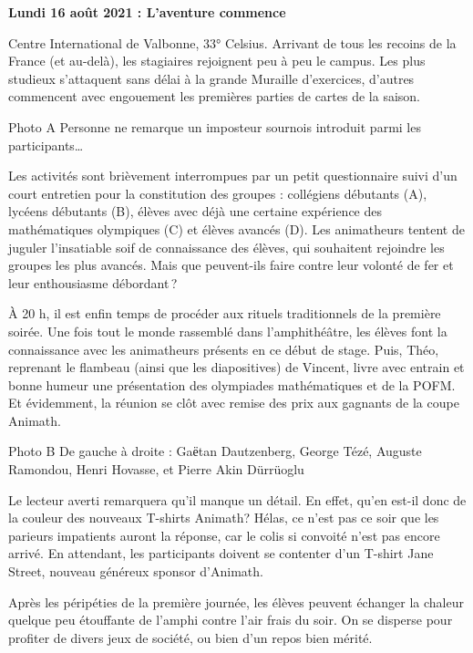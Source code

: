 \begin{center}
{\textbf{Lundi 16 août 2021 : L’aventure commence}}
\end{center}
\vspace{2mm}

Centre International de Valbonne, 33° Celsius. Arrivant de tous les recoins de la France (et au-delà), les stagiaires rejoignent peu à peu le campus. Les plus studieux s’attaquent sans délai à la grande Muraille d’exercices, d’autres commencent avec engouement les premières parties de cartes de la saison.

Photo A
Personne ne remarque un imposteur sournois introduit parmi les participants…

Les activités sont brièvement interrompues par un petit questionnaire suivi d’un court entretien pour la constitution des groupes : collégiens débutants (A), lycéens débutants (B), élèves avec déjà une certaine expérience des mathématiques olympiques (C) et élèves avancés (D). Les animatheurs tentent de juguler l’insatiable soif de connaissance des élèves, qui souhaitent rejoindre les groupes les plus avancés. Mais que peuvent-ils faire contre leur volonté de fer et leur enthousiasme débordant ?

À 20 h, il est enfin temps de procéder aux rituels traditionnels de la première soirée. Une fois tout le monde rassemblé dans l’amphithéâtre, les élèves font la connaissance avec les animatheurs présents en ce début de stage. Puis, Théo, reprenant le flambeau (ainsi que les diapositives) de Vincent, livre avec entrain et bonne humeur une présentation des olympiades mathématiques et de la POFM. Et évidemment, la réunion se clôt avec remise des prix aux gagnants de la coupe Animath.

Photo B
De gauche à droite : Gaёtan Dautzenberg, George Tézé, Auguste Ramondou, Henri Hovasse, et Pierre Akin Dürrüoglu

Le lecteur averti remarquera qu’il manque un détail. En effet, qu’en est-il donc de la couleur des nouveaux T-shirts Animath? Hélas, ce n’est pas ce soir que les parieurs impatients auront la réponse, car le colis si convoité n’est pas encore arrivé. En attendant, les participants doivent se contenter d’un T-shirt Jane Street, nouveau généreux sponsor d’Animath.

Après les péripéties de la première journée, les élèves peuvent échanger la chaleur quelque peu étouffante de l’amphi contre l’air frais du soir. On se disperse pour profiter de divers jeux de société, ou bien d’un repos bien mérité.